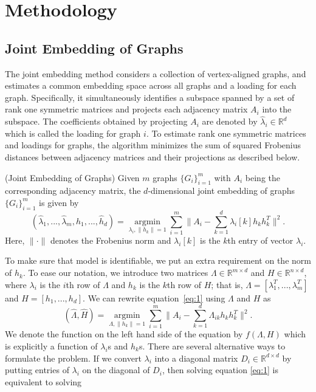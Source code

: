 \documentclass[10pt,journal,compsoc]{IEEEtran}
\newenvironment{definition}[1][Definition]{\begin{trivlist}
		\item[\hskip \labelsep {\bfseries #1}]}{\end{trivlist}}
\begin{document}
\section{Methodology}
\subsection{Joint Embedding of Graphs}
The joint embedding method considers a collection of vertex-aligned graphs, and estimates a common embedding space across all graphs and a loading for each graph. Specifically, it simultaneously identifies a subspace spanned by a set of rank one symmetric matrices and projects each adjacency matrix $A_i$ into the subspace. The coefficients obtained by projecting $A_i$ are denoted by $\hat{\lambda}_i \in \mathbb{R}^d$ which is called the loading for graph $i$. To estimate rank one symmetric matrices and loadings for graphs, the algorithm minimizes the sum of squared Frobenius distances between adjacency matrices and their projections as described below.
\begin{definition} (Joint Embedding of Graphs) Given $m$ graphs $\{G_i \} _{i=1}^{m}$ with $A_i$ being the corresponding adjacency matrix, the $d$-dimensional joint embedding of graphs $\{G_i \} _{i=1}^{m}$ is given by
\begin{equation}\label{eq:1}
 (\hat{\lambda}_1,...,\hat{\lambda}_m,\hat{h}_1,...,\hat{h}_d) = \underset{\lambda_i,\|h_k\|=1}{\operatorname{argmin}} \sum\limits_{i=1}^{m} \| A_i- \sum\limits_{k=1}^{d} \lambda_{i}[k] h_k h_k^T \|  ^2.  
\end{equation}
Here, $\| \cdot \|$ denotes the Frobenius norm and $\lambda_{i}[k]$ is the $k$th entry of vector $\lambda_i$.
\end{definition}
To make sure that model is identifiable, we put an extra requirement on the norm of $h_k$. To ease our notation, we introduce two matrices $\Lambda \in \mathbb{R}^{m \times d}$ and $H\in \mathbb{R}^{n \times d}$, where $\lambda_i$ is the $i$th row of $\Lambda$ and $h_k$ is the $k$th row of $H$; that is, $\Lambda=[\lambda_1^T,...,\lambda_m^T]$ and $H=[h_1,...,h_d]$. We can rewrite equation~\eqref{eq:1} using $\Lambda$ and $H$ as
\begin{equation*}
(\hat{\Lambda},\hat{H}) = \underset{\Lambda,\|h_k\|=1}{\operatorname{argmin}} \sum\limits_{i=1}^{m} \| A_i- \sum\limits_{k=1}^{d} \Lambda_{ik} h_k h_k^T \|  ^2.  
\end{equation*}
 We denote the function on the left hand side of the equation by $f(\Lambda,H)$ which is explicitly a function of $\lambda_i$s and $h_k$s. There are several alternative ways to formulate the problem. If we convert $\lambda_i$ into a diagonal matrix $D_i \in \mathbb{R}^{d \times d}$ by putting entries of $\lambda_i$ on the diagonal of $D_i$, then solving equation \eqref{eq:1} is equivalent to solving
\end{document}
